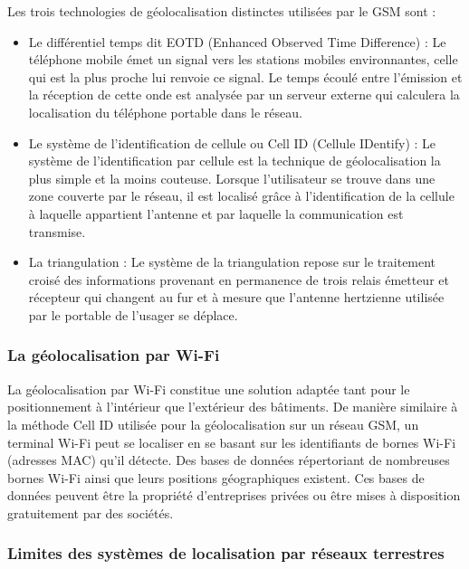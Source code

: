 \noindent Les trois technologies de géolocalisation distinctes utilisées par le GSM sont :

\begin{itemize}
	\item Le différentiel temps dit EOTD (Enhanced Observed Time Difference) : Le téléphone mobile émet un signal vers les stations mobiles environnantes, celle qui est la plus proche lui renvoie ce signal. Le temps écoulé entre l’émission et la réception de cette onde est analysée par un serveur externe qui calculera la localisation du téléphone portable dans le réseau.
	
	\item Le système de l’identification de cellule ou Cell ID (Cellule IDentify) : Le système de l’identification par cellule est la technique de géolocalisation la plus simple et la moins couteuse. Lorsque l’utilisateur se trouve dans une zone couverte par le réseau, il est localisé grâce à l’identification de la cellule à laquelle appartient l’antenne et par laquelle la communication est transmise.
	
	\item La triangulation : Le système de la triangulation repose sur le traitement croisé des informations provenant en permanence de trois relais émetteur et récepteur qui changent au fur et à mesure que l’antenne hertzienne utilisée par le portable de l’usager se déplace.
\end{itemize}

\subsubsection{La géolocalisation par Wi-Fi} 
La géolocalisation par Wi-Fi constitue une solution adaptée tant pour le positionnement à l'intérieur que l'extérieur des bâtiments.
De manière similaire à la méthode Cell ID utilisée pour la géolocalisation sur un réseau GSM, un terminal Wi-Fi peut se localiser en se basant sur les identifiants de bornes Wi-Fi (adresses MAC) qu'il détecte. Des bases de données répertoriant de nombreuses bornes Wi-Fi ainsi que leurs positions géographiques existent. Ces bases de données peuvent être la propriété d'entreprises privées ou être mises à disposition gratuitement par des sociétés.

\subsubsection{Limites des systèmes de localisation par réseaux terrestres }
 
